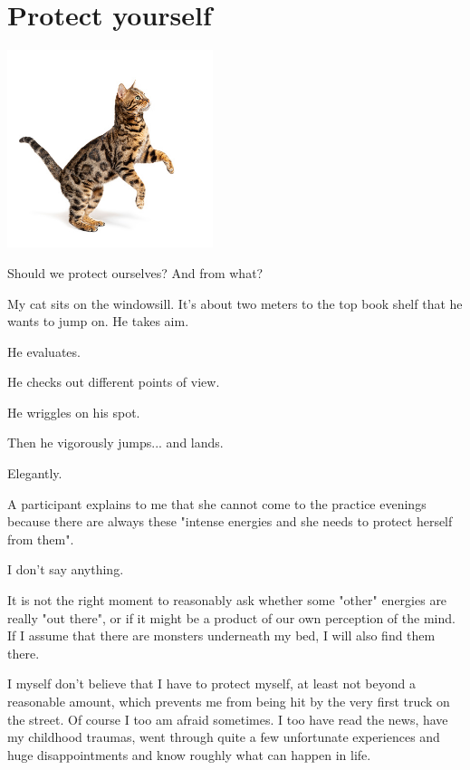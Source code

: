 \section{Protect yourself}

\begin{center}
\includegraphics[width=6cm]{images/15_protect.jpg}
\end{center}

\begin{textit}
Should we protect ourselves? And from what?

My cat sits on the windowsill. It's about two meters to the top book shelf that he wants to jump on. He takes aim.

He evaluates.

He checks out different points of view.

He wriggles on his spot.

Then he vigorously jumps... and lands.

Elegantly.
\end{textit}

A participant explains to me that she cannot come to the practice evenings because there are always these "intense energies and she needs to protect herself from them".

I don't say anything.

It is not the right moment to reasonably ask whether some "other" energies are really "out there", or if it might be a product of our own perception of the mind. If I assume that there are monsters underneath my bed, I will also find them there.

I myself don't believe that I have to protect myself, at least not beyond a reasonable amount, which prevents me from being hit by the very first truck on the street. Of course I too am afraid sometimes. I too have read the news, have my childhood traumas, went through quite a few unfortunate experiences and huge disappointments and know roughly what can happen in life.


